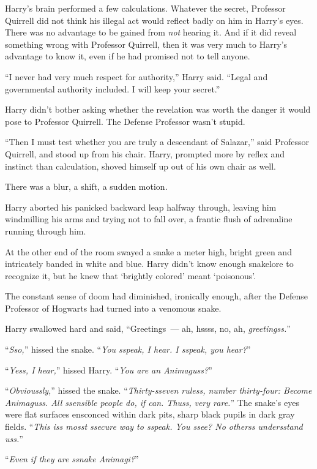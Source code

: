 Harry's brain performed a few calculations. Whatever the secret, Professor Quirrell did not think his illegal act would reflect badly on him in Harry's eyes. There was no advantage to be gained from \emph{not} hearing it. And if it did reveal something wrong with Professor Quirrell, then it was very much to Harry's advantage to know it, even if he had promised not to tell anyone.

``I never had very much respect for authority,'' Harry said. ``Legal and governmental authority included. I will keep your secret.''

Harry didn't bother asking whether the revelation was worth the danger it would pose to Professor Quirrell. The Defense Professor wasn't stupid.

``Then I must test whether you are truly a descendant of Salazar,'' said Professor Quirrell, and stood up from his chair. Harry, prompted more by reflex and instinct than calculation, shoved himself up out of his own chair as well.

There was a blur, a shift, a sudden motion.

Harry aborted his panicked backward leap halfway through, leaving him windmilling his arms and trying not to fall over, a frantic flush of adrenaline running through him.

At the other end of the room swayed a snake a meter high, bright green and intricately banded in white and blue. Harry didn't know enough snakelore to recognize it, but he knew that `brightly colored' meant `poisonous'.

The constant sense of doom had diminished, ironically enough, after the Defense Professor of Hogwarts had turned into a venomous snake.

Harry swallowed hard and said, ``Greetings~--- ah, hssss, no, ah, \emph{greetingss.}''

``\emph{Sso,}'' hissed the snake. ``\emph{You sspeak, I hear. I sspeak, you hear?}''

``\emph{Yess, I hear,}'' hissed Harry. ``\emph{You are an Animaguss?}''

``\emph{Obvioussly,}'' hissed the snake. ``\emph{Thirty-sseven ruless, number thirty-four: Become Animaguss. All ssensible people do, if can. Thuss,} \emph{very rare.}'' The snake's eyes were flat surfaces ensconced within dark pits, sharp black pupils in dark gray fields. ``\emph{This iss mosst ssecure way to sspeak. You ssee? No otherss undersstand uss.}''

``\emph{Even if they are ssnake Animagi?}''

